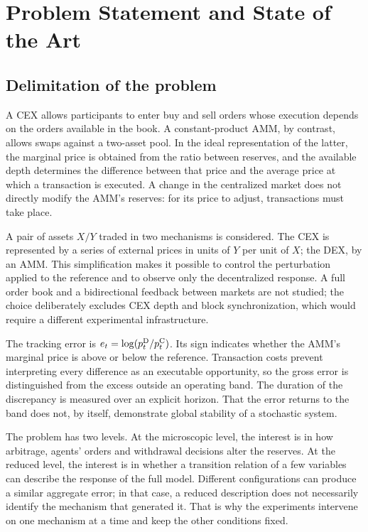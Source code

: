 \chapter{Problem Statement and State of the Art}
\label{cap:problema}

\section{Delimitation of the problem}

A CEX allows participants to enter buy and sell orders whose execution depends on the orders available in the book. A constant-product AMM, by contrast, allows swaps against a two-asset pool. In the ideal representation of the latter, the marginal price is obtained from the ratio between reserves, and the available depth determines the difference between that price and the average price at which a transaction is executed. A change in the centralized market does not directly modify the AMM's reserves: for its price to adjust, transactions must take place.

A pair of assets $X/Y$ traded in two mechanisms is considered. The CEX is represented by a series of external prices in units of $Y$ per unit of $X$; the DEX, by an AMM. This simplification makes it possible to control the perturbation applied to the reference and to observe only the decentralized response. A full order book and a bidirectional feedback between markets are not studied; the choice deliberately excludes CEX depth and block synchronization, which would require a different experimental infrastructure.

The tracking error is $e_t=\log(p^{\mathrm{D}}_t/p^{\mathrm{C}}_t)$. Its sign indicates whether the AMM's marginal price is above or below the reference. Transaction costs prevent interpreting every difference as an executable opportunity, so the gross error is distinguished from the excess outside an operating band. The duration of the discrepancy is measured over an explicit horizon. That the error returns to the band does not, by itself, demonstrate global stability of a stochastic system.

The problem has two levels. At the microscopic level, the interest is in how arbitrage, agents' orders and withdrawal decisions alter the reserves. At the reduced level, the interest is in whether a transition relation of a few variables can describe the response of the full model. Different configurations can produce a similar aggregate error; in that case, a reduced description does not necessarily identify the mechanism that generated it. That is why the experiments intervene on one mechanism at a time and keep the other conditions fixed.

